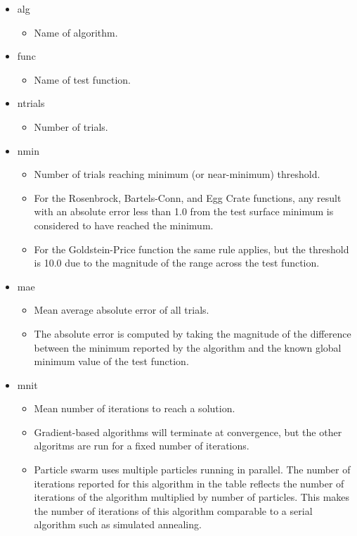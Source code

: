 \documentclass{vgtc}                          %
\begin{document}
\begin{itemize}
\item alg
\begin{itemize}
	\item Name of algorithm.
\end{itemize}
\item func
\begin{itemize}
	\item Name of test function.
\end{itemize}
\item ntrials
\begin{itemize}
	\item Number of trials.
\end{itemize}
\item nmin
\begin{itemize}
	\item Number of trials reaching minimum (or near-minimum) threshold.
	\item For the Rosenbrock, Bartels-Conn, and Egg Crate functions, any result with an absolute error less than 1.0 from the test surface minimum is considered to have reached the minimum.
	\item For the Goldstein-Price function the same rule applies, but the threshold is 10.0 due to the magnitude of the range across the test function.
\end{itemize}
\item mae
\begin{itemize}
	\item Mean average absolute error of all trials.
	\item The absolute error is computed by taking the magnitude of the difference between the minimum reported by the algorithm and the known global minimum value of the test function.
\end{itemize}
\item mnit
\begin{itemize}
	\item Mean number of iterations to reach a solution.
    \item Gradient-based algorithms will terminate at convergence, but the other algoritms are run for a fixed number of iterations.
	\item Particle swarm uses multiple particles running in parallel. The number of iterations reported for this algorithm in the table reflects the number of iterations of the algorithm multiplied by number of particles.  This makes the number of iterations of this algorithm comparable to a serial algorithm such as simulated annealing.

\end{itemize}
\end{itemize}
\end{document}

